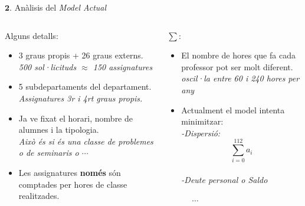 \documentclass[twocolumn]{beamer}
\begin{document}
\begin{frame}{$\mathbf 2.$ Anàlisis del \textit{Model Actual}}
\begin{columns}[t]
	\begin{column}{.5\textwidth}
		\begin{block}{Alguns detalls:}
			\begin{itemize}
				\footnotesize
				\item 3 graus propis + 26 graus externs. \\ \textit{\footnotesize \color{blue} 500 sol·licituds $\approx$ 150 assignatures}
				\item 5 subdepartaments del departament. \\ \textit{ \footnotesize \color{blue} Assignatures 3r i 4rt graus propis.}
				\item  Ja ve fixat el horari, nombre de alumnes i la tipologia. \\ \textit{\footnotesize \color{blue} Això és si és una classe de problemes o de seminaris o $\cdots$}
				\item Les assignatures \textbf{només} són comptades per hores de classe realitzades.
			\end{itemize}
		\end{block}
	\end{column}
	\begin{column}{.5\textwidth}
		
		\begin{block}{\Large$\sum:   $}
			\begin{itemize}
			\footnotesize
			\item El nombre de hores que fa cada professor pot ser molt diferent. \\ \textit{\footnotesize \color{blue} oscil·la entre 60 i 240 hores per any}
			\item Actualment el model intenta minimitzar:
			\textit{\footnotesize \color{blue}
				\\-Dispersió:$$\sum_{i=0}^{112} a_{i}$$
				\\-Deute personal o Saldo}
		     \end{itemize}
		\end{block}
	
		\Huge$\quad  \quad  \quad \cdots$ 
		
	    \end{column}
\end{columns}
\end{frame}
\end{document}
